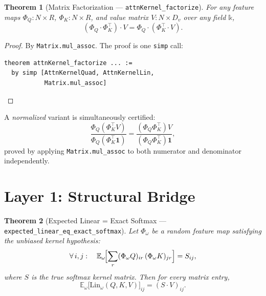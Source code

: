 \documentclass[11pt,a4paper,twocolumn]{article}
\newtheorem{theorem}{Theorem}[section]
\theoremstyle{definition}
\theoremstyle{remark}
\newcommand{\E}{\mathbb{E}}
\newcommand{\leancode}[1]{\texttt{\color{leanblue}#1}}
\begin{document}
\begin{theorem}[Matrix Factorization — \leancode{attnKernel\_factorize}]
\label{thm:factor}
For any feature maps $\Phi_Q : N \times R$, $\Phi_K : N \times R$, and
value matrix $V : N \times D_v$ over any field $\mathbb{k}$,
\begin{equation}
  (\Phi_Q \cdot \Phi_K^\top) \cdot V
  = \Phi_Q \cdot (\Phi_K^\top \cdot V).
\end{equation}
\end{theorem}

\begin{proof}
By \leancode{Matrix.mul\_assoc}. The proof is one \texttt{simp} call:
\begin{lstlisting}
theorem attnKernel_factorize ... :=
  by simp [AttnKernelQuad, AttnKernelLin,
           Matrix.mul_assoc]
\end{lstlisting}
\end{proof}

A \emph{normalized} variant is simultaneously certified:
\begin{equation}
  \frac{\Phi_Q(\Phi_K^\top V)}{\Phi_Q(\Phi_K^\top \mathbf{1})}
  =
  \frac{(\Phi_Q \Phi_K^\top) V}{(\Phi_Q \Phi_K^\top) \mathbf{1}},
\end{equation}
proved by applying \leancode{Matrix.mul\_assoc} to both numerator and
denominator independently.


\section{Layer 1: Structural Bridge}
\label{sec:layer1}

\begin{theorem}[Expected Linear = Exact Softmax ---
\leancode{expected\_linear\_eq\_exact\_softmax}]
\label{thm:bridge}
Let $\Phi_\omega$ be a random feature map satisfying the \emph{unbiased
kernel hypothesis}:
\begin{equation}
  \forall\, i,j:\quad
  \E_\omega\!\Bigl[\sum_{r} (\Phi_\omega Q)_{ir}\,(\Phi_\omega K)_{jr}\Bigr]
  = S_{ij},
\end{equation}
where $S$ is the true softmax kernel matrix. Then for every matrix entry,
\begin{equation}
  \E_\omega\!\bigl[\mathrm{Lin}_\omega(Q,K,V)\bigr]_{ij}
  = (S \cdot V)_{ij}.
\end{equation}
\end{theorem}
\end{document}
